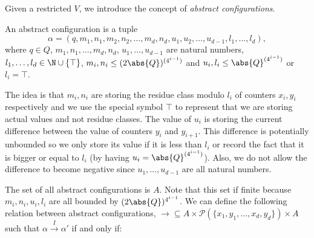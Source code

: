 





Given a restricted \laVASS $V$, we introduce the concept of \emph{abstract configurations}. 
\begin{definition}
An abstract configuration is a tuple 
$$\alpha=(q, m_1,n_1,m_2,n_2,\dots,m_{d},n_{d},u_1,u_2,\dots,u_{d-1},l_1,\dots,l_d),$$
where $q\in Q$, $m_1,n_1,\dots,m_d,n_d$, $u_1,\dots,u_{d-1}$ are natural numbers, $l_1,\dots,l_d\in\N\cup\{\top\}$, $m_i,n_i\leq (2\abs{Q})^{(4^{i-1})}$ and $u_i,l_i\leq\abs{Q}^{(4^{i-1})}$ or $l_i=\top$.
\end{definition}
The idea is that $m_i,n_i$ are storing the residue class modulo $l_i$ of counters $x_i,y_i$ respectively and we use the special symbol $\top$ to represent that we are storing actual values and not residue classes. The value of $u_i$ is storing the current difference between the value of counters $y_{i}$ and $y_{i+1}$. This difference is potentially unbounded so we only store its value if it is less than $l_i$ or record the fact that it is bigger or equal to $l_i$ (by having $u_i=\abs{Q}^{(4^{i-1})}$). Also, we do not allow the difference to become negative since $u_1,\dots,u_{d-1}$ are all natural numbers. 

The set of all abstract configurations is $A$. Note that this set if finite because $m_i,n_i,u_i,l_i$ are all bounded by $(2\abs{Q})^{4^{i-1}}$. We can define the following relation between abstract configurations, ${\xrightarrow{}}\subseteq A\times\mathcal{P}(\{x_1,y_1,\dots,x_{d},y_{d}\})\times A$ such that $\alpha\xrightarrow{I}\alpha'$ if and only if:


